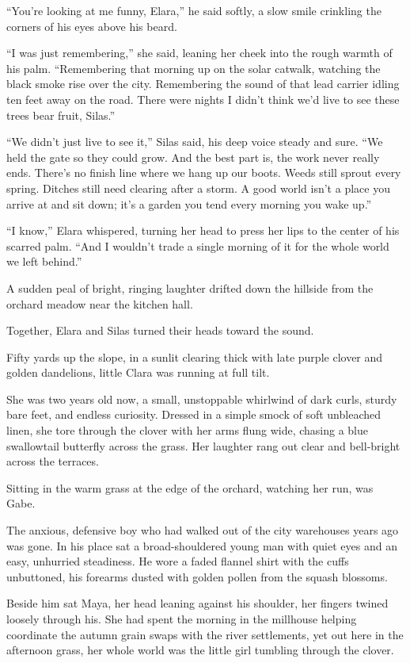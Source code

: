 ``You're looking at me funny, Elara,'' he said softly, a slow smile crinkling the corners of his eyes above his beard.

``I was just remembering,'' she said, leaning her cheek into the rough warmth of his palm. ``Remembering that morning up on the solar catwalk, watching the black smoke rise over the city. Remembering the sound of that lead carrier idling ten feet away on the road. There were nights I didn't think we'd live to see these trees bear fruit, Silas.''

``We didn't just live to see it,'' Silas said, his deep voice steady and sure. ``We held the gate so they could grow. And the best part is, the work never really ends. There's no finish line where we hang up our boots. Weeds still sprout every spring. Ditches still need clearing after a storm. A good world isn't a place you arrive at and sit down; it's a garden you tend every morning you wake up.''

``I know,'' Elara whispered, turning her head to press her lips to the center of his scarred palm. ``And I wouldn't trade a single morning of it for the whole world we left behind.''

A sudden peal of bright, ringing laughter drifted down the hillside from the orchard meadow near the kitchen hall.

Together, Elara and Silas turned their heads toward the sound.

Fifty yards up the slope, in a sunlit clearing thick with late purple clover and golden dandelions, little Clara was running at full tilt.

She was two years old now, a small, unstoppable whirlwind of dark curls, sturdy bare feet, and endless curiosity. Dressed in a simple smock of soft unbleached linen, she tore through the clover with her arms flung wide, chasing a blue swallowtail butterfly across the grass. Her laughter rang out clear and bell-bright across the terraces.

Sitting in the warm grass at the edge of the orchard, watching her run, was Gabe.

The anxious, defensive boy who had walked out of the city warehouses years ago was gone. In his place sat a broad-shouldered young man with quiet eyes and an easy, unhurried steadiness. He wore a faded flannel shirt with the cuffs unbuttoned, his forearms dusted with golden pollen from the squash blossoms.

Beside him sat Maya, her head leaning against his shoulder, her fingers twined loosely through his. She had spent the morning in the millhouse helping coordinate the autumn grain swaps with the river settlements, yet out here in the afternoon grass, her whole world was the little girl tumbling through the clover.

